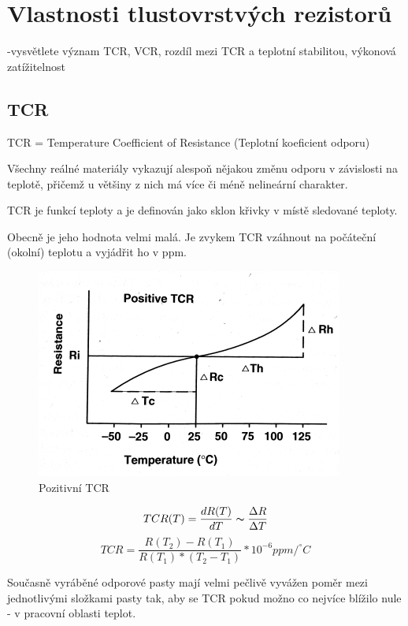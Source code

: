 \section{Vlastnosti tlustovrstvých rezistorů}
-vysvětlete význam TCR, VCR, rozdíl mezi TCR a
teplotní stabilitou, výkonová zatížitelnost

\subsection{TCR}
TCR = Temperature Coefficient of Resistance (Teplotní koeficient odporu)

Všechny reálné materiály vykazují alespoň nějakou změnu odporu v závislosti na teplotě, přičemž u většiny z nich má více či méně nelineární charakter.

TCR je funkcí teploty a je definován jako sklon křivky v místě sledované teploty.

Obecně je jeho hodnota velmi malá. Je zvykem TCR vzáhnout na počáteční (okolní) teplotu a vyjádřit ho v ppm.

\begin{figure}[h]
   \begin{center}
     \includegraphics[scale=1]{images/TCRpos.png}
   \end{center}
   \caption{Pozitivní TCR}
\end{figure}
\begin{equation}
TCR(T) = \frac{dR(T)}{dT} \thicksim \frac{\Delta R}{\Delta T}
\end{equation}
\begin{equation}
TCR = \frac{R(T_{2})-R(T_{1})}{R(T_{1})*(T_{2}-T_{1})}*10^{-6}ppm/^{\circ}C
\end{equation}

Současně vyráběné odporové pasty mají velmi pečlivě vyvážen poměr mezi jednotlivými
složkami pasty tak, aby se TCR pokud možno co nejvíce blížilo nule - v pracovní oblasti
teplot.

